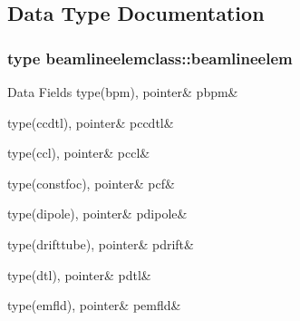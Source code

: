 \subsection{Data Type Documentation}
\label{structbeamlineelemclass_1_1beamlineelem}
\subsubsection{type beamlineelemclass\+::beamlineelem}
\begin{DoxyFields}{Data Fields}
\mbox{\label{namespacebeamlineelemclass_ab1486848bf9231eeed15a83170442e32}} 
type(bpm), pointer&
pbpm&
\\
\hline

\mbox{\label{namespacebeamlineelemclass_afc03034604a05eb1bc374945e4ab176d}} 
type(ccdtl), pointer&
pccdtl&
\\
\hline

\mbox{\label{namespacebeamlineelemclass_ac12416dfd09e0a7195c5297b12c1194f}} 
type(ccl), pointer&
pccl&
\\
\hline

\mbox{\label{namespacebeamlineelemclass_a39cb4d5220b28f075e92fd09819f86ce}} 
type(constfoc), pointer&
pcf&
\\
\hline

\mbox{\label{namespacebeamlineelemclass_a2427f96729e2667041326c4dcf583b82}} 
type(dipole), pointer&
pdipole&
\\
\hline

\mbox{\label{namespacebeamlineelemclass_a295bb7932c8566c26f980d0bd89d2f7d}} 
type(drifttube), pointer&
pdrift&
\\
\hline

\mbox{\label{namespacebeamlineelemclass_a8efdbd654fcb17a5dcf4826638e79720}} 
type(dtl), pointer&
pdtl&
\\
\hline

\mbox{\label{namespacebeamlineelemclass_a626e5426ee98993dfe2352be10075411}} 
type(emfld), pointer&
pemfld&
\\
\hline


\end{DoxyFields}
